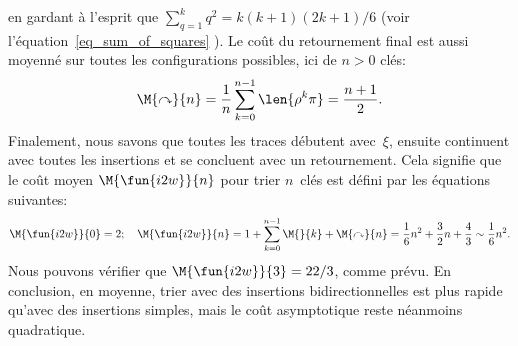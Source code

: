 en gardant à l'esprit que \(\sum_{q=1}^{k}{q^2} = k(k+1)(2k+1)/6\)
(voir l'équation~\eqref{eq_sum_of_squares}
). Le coût du retournement final est aussi
moyenné sur toutes les configurations possibles, ici de \(n>0\) clés:
\begin{equation*}
\M{\curvearrowright}{n} = \frac{1}{n}\sum_{k=0}^{n-1}\len{\rho^k\pi}
                        = \frac{n+1}{2}.
\end{equation*}
Finalement, nous savons que toutes les traces débutent avec~\(\xi\),
ensuite continuent avec toutes les insertions et se concluent avec un
retournement. Cela signifie que le coût moyen
\(\M{\fun{i2w}}{n}\) pour trier
\(n\)~clés est défini par les équations suivantes:
\begin{equation*}
\M{\fun{i2w}}{0} = 2;\quad
\M{\fun{i2w}}{n} = 1 + \sum_{k=0}^{n-1}{\M{}{k}} + \M{\curvearrowright}{n}
                 = \frac{1}{6}n^2 + \frac{3}{2}n + \frac{4}{3}
                 \sim \frac{1}{6}n^2.
\end{equation*}
Nous pouvons vérifier que \(\M{\fun{i2w}}{3} = 22/3\), comme prévu. En
conclusion, en moyenne, trier avec des insertions bidirectionnelles
est plus rapide qu'avec des insertions simples, mais le coût
asymptotique reste néanmoins quadratique.

